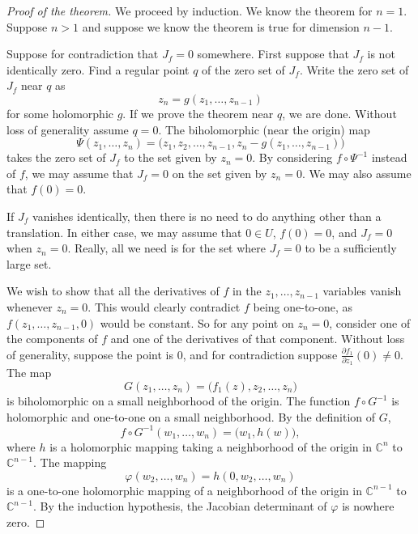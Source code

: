 \documentclass[12pt,openany]{book}
\newcommand{\C}{{\mathbb{C}}}
\theoremstyle{plain}
\theoremstyle{remark}
\theoremstyle{definition}
\theoremstyle{exercise}
\theoremstyle{example}
\begin{document}
\begin{proof}[Proof of the theorem]
We proceed by induction.  We know the theorem for $n=1$.
Suppose $n > 1$ and suppose we know the theorem is true for dimension $n-1$.

Suppose for contradiction that $J_f = 0$ somewhere.
First suppose that $J_f$ is not identically zero.
Find a regular point $q$ of the zero set of $J_f$.
Write the zero set of $J_f$ near $q$ as
\begin{equation*}
z_n = g(z_1,\ldots,z_{n-1})
\end{equation*}
for some holomorphic $g$.
If we prove the theorem near $q$, we are done.  Without loss of generality
assume $q=0$.  The biholomorphic (near the origin) map
\begin{equation*}
\Psi(z_1,\ldots,z_n) = \bigl(z_1,z_2,\ldots,z_{n-1},z_n-g(z_1,\ldots,z_{n-1}) \bigr)
\end{equation*}
takes the zero set of $J_f$ to the set given by $z_n=0$.  By considering
$f \circ \Psi^{-1}$ instead of $f$, we may assume
that $J_f = 0$ on the set given by $z_n=0$.  We may also
assume that $f(0) = 0$.

If $J_f$ vanishes identically, then there is no need to do anything other
than a translation.  In either case,
we may assume that $0 \in U$, $f(0)=0$, and
$J_f = 0$ when $z_n=0$.
Really, all we need is for the set where $J_f=0$ to be a sufficiently
large set.

We wish to show that all the derivatives of $f$ in the $z_1,\ldots,z_{n-1}$
variables vanish whenever $z_n = 0$.  This
would clearly contradict $f$ being one-to-one,
as $f(z_1,\ldots,z_{n-1},0)$ would be constant.
So for any point on $z_n=0$,
consider one of the components
of $f$ and one of the derivatives of that component.
Without loss of generality, suppose the point is 0, and
for contradiction suppose
$\frac{\partial f_1}{\partial z_1}(0) \not= 0$.
The map
\begin{equation*}
G(z_1,\ldots,z_n) = \bigl(f_1(z),z_2,\ldots,z_n\bigr)
\end{equation*}
is biholomorphic on a small neighborhood of the origin.
The function $f \circ G^{-1}$ is holomorphic and one-to-one on a small
neighborhood.  By the definition of $G$,
\begin{equation*}
f \circ G^{-1} (w_1,\ldots,w_n) = \bigl(w_1,h(w)\bigr) ,
\end{equation*}
where $h$ is a holomorphic mapping taking a neighborhood of the
origin in $\C^n$ to $\C^{n-1}$.
The mapping
\begin{equation*}
\varphi(w_2,\ldots,w_n) = h(0,w_2,\ldots,w_n)
\end{equation*}
is a one-to-one holomorphic mapping of a neighborhood of the origin in
$\C^{n-1}$ to $\C^{n-1}$.  By the induction hypothesis, the Jacobian determinant of
$\varphi$ is nowhere zero.


\end{proof}
\end{document}
